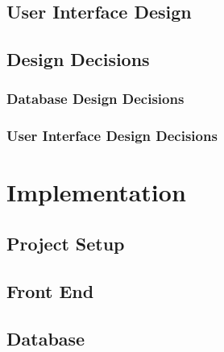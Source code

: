 \documentclass{l3proj}
\begin{document}
\section{User Interface Design}

\section{Design Decisions}

\subsection{Database Design Decisions}

\subsection{User Interface Design Decisions}

\chapter{Implementation}
\label{impl}

\section{Project Setup}

\section{Front End}

\section{Database}

\end{document}
